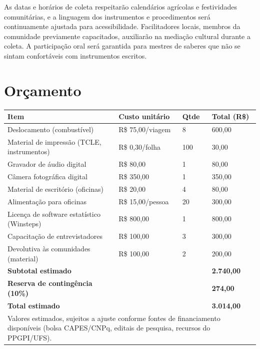 \documentclass[12pt,a4paper,brazil]{article}
\begin{document}
As datas e horários de coleta respeitarão calendários agrícolas e festividades comunitárias, e a linguagem dos instrumentos e procedimentos será continuamente ajustada para acessibilidade. Facilitadores locais, membros da comunidade previamente capacitados, auxiliarão na mediação cultural durante a coleta. A participação oral será garantida para mestres de saberes que não se sintam confortáveis com instrumentos escritos.


\section{Orçamento}

\begin{longtable}{p{6cm}p{2.5cm}p{2cm}p{2.5cm}}
\toprule
\textbf{Item} & \textbf{Custo unitário} & \textbf{Qtde} & \textbf{Total (R\$)} \\
\midrule
\endhead
Deslocamento (combustível) & R\$ 75,00/viagem & 8 & 600,00 \\
Material de impressão (TCLE, instrumentos) & R\$ 0,30/folha & 100 & 30,00 \\
Gravador de áudio digital & R\$ 80,00 & 1 & 80,00 \\
Câmera fotográfica digital & R\$ 350,00 & 1 & 350,00 \\
Material de escritório (oficinas) & R\$ 20,00 & 4 & 80,00 \\
Alimentação para oficinas & R\$ 15,00/pessoa & 20 & 300,00 \\
Licença de software estatístico (Winsteps) & R\$ 800,00 & 1 & 800,00 \\
Capacitação de entrevistadores & R\$ 100,00 & 3 & 300,00 \\
Devolutiva às comunidades (material) & R\$ 100,00 & 2 & 200,00 \\
\midrule
\textbf{Subtotal estimado} & & & \textbf{2.740,00} \\
\textbf{Reserva de contingência (10\%)} & & & \textbf{274,00} \\
\midrule
\textbf{Total estimado} & & & \textbf{3.014,00} \\
\bottomrule
\multicolumn{4}{p{13cm}}{\footnotesize Valores estimados, sujeitos a ajuste conforme fontes de financiamento disponíveis (bolsa CAPES/CNPq, editais de pesquisa, recursos do PPGPI/UFS).} \\
\end{longtable}
\end{document}
